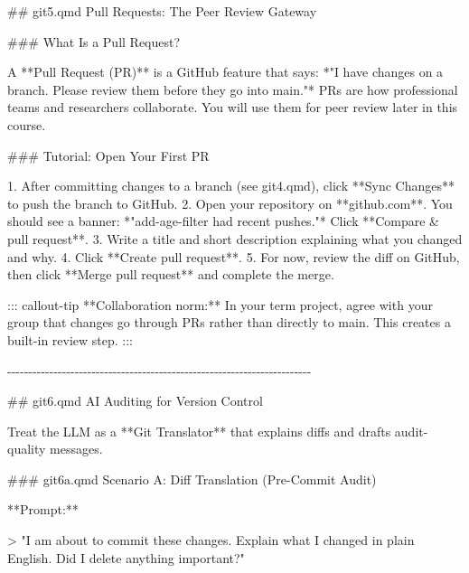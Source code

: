 \documentclass[
  letterpaper,
  DIV=11,
  numbers=noendperiod,
  oneside]{scrreprt}
\newenvironment{Shaded}{\begin{snugshade}}{\end{snugshade}}
\newcommand{\AttributeTok}[1]{\textcolor[rgb]{0.40,0.45,0.13}{#1}}
\newcommand{\FunctionTok}[1]{\textcolor[rgb]{0.28,0.35,0.67}{#1}}
\newcommand{\InformationTok}[1]{\textcolor[rgb]{0.37,0.37,0.37}{#1}}
\newcommand{\NormalTok}[1]{\textcolor[rgb]{0.00,0.23,0.31}{#1}}
\newcommand{\SpecialStringTok}[1]{\textcolor[rgb]{0.13,0.47,0.30}{#1}}
\begin{document}
\begin{Shaded}
\begin{Highlighting}[numbers=left,,]
\FunctionTok{\#\# \textasciigrave{}git5.qmd\textasciigrave{} Pull Requests: The Peer Review Gateway}

\FunctionTok{\#\#\# What Is a Pull Request?}

\NormalTok{A **Pull Request (PR)** is a GitHub feature that says: *"I have changes on a branch. Please review them before they go into \textasciigrave{}main\textasciigrave{}."* PRs are how professional teams and researchers collaborate. You will use them for peer review later in this course.}

\FunctionTok{\#\#\# Tutorial: Open Your First PR}

\SpecialStringTok{1.  }\NormalTok{After committing changes to a branch (see }\InformationTok{\textasciigrave{}git4.qmd\textasciigrave{}}\NormalTok{), click **Sync Changes** to push the branch to GitHub.}
\SpecialStringTok{2.  }\NormalTok{Open your repository on **github.com**. You should see a banner: *"add{-}age{-}filter had recent pushes."* Click **Compare \& pull request**.}
\SpecialStringTok{3.  }\NormalTok{Write a title and short description explaining what you changed and why.}
\SpecialStringTok{4.  }\NormalTok{Click **Create pull request**.}
\SpecialStringTok{5.  }\NormalTok{For now, review the diff on GitHub, then click **Merge pull request** and complete the merge.}

\NormalTok{::: callout{-}tip}
\NormalTok{**Collaboration norm:** In your term project, agree with your group that changes go through PRs rather than directly to }\InformationTok{\textasciigrave{}main\textasciigrave{}}\NormalTok{. This creates a built{-}in review step.}
\NormalTok{:::}

\NormalTok{{-}{-}{-}{-}{-}{-}{-}{-}{-}{-}{-}{-}{-}{-}{-}{-}{-}{-}{-}{-}{-}{-}{-}{-}{-}{-}{-}{-}{-}{-}{-}{-}{-}{-}{-}{-}{-}{-}{-}{-}{-}{-}{-}{-}{-}{-}{-}{-}{-}{-}{-}{-}{-}{-}{-}{-}{-}{-}{-}{-}{-}{-}{-}{-}{-}{-}{-}{-}{-}{-}{-}{-}}

\FunctionTok{\#\# \textasciigrave{}git6.qmd\textasciigrave{} AI Auditing for Version Control}

\NormalTok{Treat the LLM as a **Git Translator** that explains diffs and drafts audit{-}quality messages.}

\FunctionTok{\#\#\# \textasciigrave{}git6a.qmd\textasciigrave{} Scenario A: Diff Translation (Pre{-}Commit Audit)}

\NormalTok{**Prompt:**}

\AttributeTok{\textgreater{} "I am about to commit these changes. Explain what I changed in plain English. Did I delete anything important?"}


\end{Highlighting}
\end{Shaded}
\end{document}
